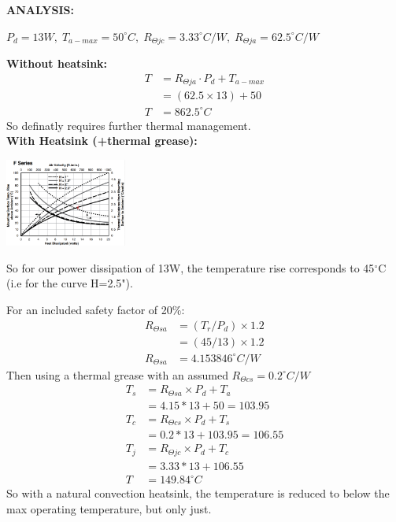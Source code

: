 \documentclass[11pt]{article}
\begin{document}
\begin{preview}
\begin{enumerate}[label=\alph*)]
          \textbf{ANALYSIS:}

          $P_d = 13W, \; T_{a-max} = 50^{\circ}C, \; R_{\Theta jc} = 3.33^{\circ}C/W, \; R_{\Theta ja} = 62.5^{\circ}C/W$ 

          \textbf{Without heatsink:}
          \begin{align*}
          T &= R_{\Theta ja} {\cdot} P_d + T_{a-max} \\
          &= (62.5 \times 13)+50 \\
          T &= 862.5^{\circ}C
          \end{align*}
          So definatly requires further thermal management. \\

          \textbf{With Heatsink (+thermal grease):}

          \begin{center}
            \includegraphics[width=0.3\textwidth]{F_series_heatsink_natural.png}
          \end{center}

          So for our power dissipation of 13W, the temperature rise corresponds to 45$^\circ$C (i.e for the curve H=2.5").

          For an included safety factor of 20\%:
          \begin{align*}
            R_{\Theta sa} &= (T_{r} / P_{d}) \times 1.2 \\
            &= (45/13) \times 1.2\\
            R_{\Theta sa} &=4.153846^{\circ}C/W
          \end{align*}
          Then using a thermal grease with an assumed $R_{\Theta cs} = 0.2^{\circ}C/W$
          \begin{align*}
            T_{s} &= R_{\Theta sa} \times P_{d} + T_{a}\\
                  &= 4.15*13+50=103.95 \\
            T_{c} &= R_{\Theta cs} \times P_{d} + T_{s} \\
                  &= 0.2*13+103.95=106.55 \\
            T_{j} &= R_{\Theta jc} \times P_{d} + T_{c} \\
                  &= 3.33*13+106.55 \\ 
            T     &= 149.84^{\circ}C
          \end{align*}
          So with a natural convection heatsink, the temperature is reduced to below the max operating temperature, but only just.


\end{enumerate}
\end{preview}
\end{document}
